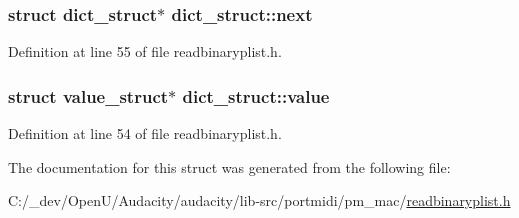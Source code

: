 \subsubsection[{\texorpdfstring{next}{next}}]{\setlength{\rightskip}{0pt plus 5cm}struct {\bf dict\+\_\+struct}$\ast$ dict\+\_\+struct\+::next}\hypertarget{structdict__struct_adc33b2f20c741e3cde74fbdda543f69b}{}\label{structdict__struct_adc33b2f20c741e3cde74fbdda543f69b}


Definition at line 55 of file readbinaryplist.\+h.

\subsubsection[{\texorpdfstring{value}{value}}]{\setlength{\rightskip}{0pt plus 5cm}struct {\bf value\+\_\+struct}$\ast$ dict\+\_\+struct\+::value}\hypertarget{structdict__struct_a8f0a429176b1c1a0eabb9e1e73d228a1}{}\label{structdict__struct_a8f0a429176b1c1a0eabb9e1e73d228a1}


Definition at line 54 of file readbinaryplist.\+h.



The documentation for this struct was generated from the following file\+:\begin{DoxyCompactItemize}
\item 
C\+:/\+\_\+dev/\+Open\+U/\+Audacity/audacity/lib-\/src/portmidi/pm\+\_\+mac/\hyperlink{readbinaryplist_8h}{readbinaryplist.\+h}\end{DoxyCompactItemize}
